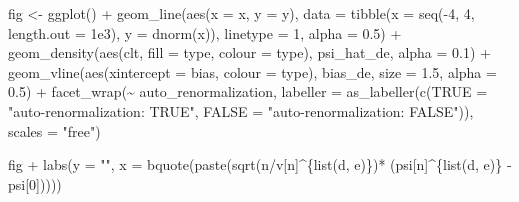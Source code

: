 \documentclass[
  11pt,
  openright,twoside]{book}
\newenvironment{Shaded}{\begin{snugshade}}{\end{snugshade}}
\newcommand{\AttributeTok}[1]{\textcolor[rgb]{0.77,0.63,0.00}{#1}}
\newcommand{\DecValTok}[1]{\textcolor[rgb]{0.00,0.00,0.81}{#1}}
\newcommand{\FloatTok}[1]{\textcolor[rgb]{0.00,0.00,0.81}{#1}}
\newcommand{\FunctionTok}[1]{\textcolor[rgb]{0.00,0.00,0.00}{#1}}
\newcommand{\NormalTok}[1]{#1}
\newcommand{\OtherTok}[1]{\textcolor[rgb]{0.56,0.35,0.01}{#1}}
\newcommand{\SpecialCharTok}[1]{\textcolor[rgb]{0.00,0.00,0.00}{#1}}
\newcommand{\StringTok}[1]{\textcolor[rgb]{0.31,0.60,0.02}{#1}}
\theoremstyle{definition}
\theoremstyle{definition}
\theoremstyle{definition}
\theoremstyle{definition}
\theoremstyle{remark}
\begin{document}
\begin{Shaded}
\begin{Highlighting}[]
\NormalTok{fig }\OtherTok{\textless{}{-}} \FunctionTok{ggplot}\NormalTok{() }\SpecialCharTok{+}
  \FunctionTok{geom\_line}\NormalTok{(}\FunctionTok{aes}\NormalTok{(}\AttributeTok{x =}\NormalTok{ x, }\AttributeTok{y =}\NormalTok{ y), }
            \AttributeTok{data =} \FunctionTok{tibble}\NormalTok{(}\AttributeTok{x =} \FunctionTok{seq}\NormalTok{(}\SpecialCharTok{{-}}\DecValTok{4}\NormalTok{, }\DecValTok{4}\NormalTok{, }\AttributeTok{length.out =} \FloatTok{1e3}\NormalTok{),}
                          \AttributeTok{y =} \FunctionTok{dnorm}\NormalTok{(x)),}
            \AttributeTok{linetype =} \DecValTok{1}\NormalTok{, }\AttributeTok{alpha =} \FloatTok{0.5}\NormalTok{) }\SpecialCharTok{+}
  \FunctionTok{geom\_density}\NormalTok{(}\FunctionTok{aes}\NormalTok{(clt, }\AttributeTok{fill =}\NormalTok{ type, }\AttributeTok{colour =}\NormalTok{ type),}
\NormalTok{               psi\_hat\_de, }\AttributeTok{alpha =} \FloatTok{0.1}\NormalTok{) }\SpecialCharTok{+}
  \FunctionTok{geom\_vline}\NormalTok{(}\FunctionTok{aes}\NormalTok{(}\AttributeTok{xintercept =}\NormalTok{ bias, }\AttributeTok{colour =}\NormalTok{ type),}
\NormalTok{             bias\_de, }\AttributeTok{size =} \FloatTok{1.5}\NormalTok{, }\AttributeTok{alpha =} \FloatTok{0.5}\NormalTok{) }\SpecialCharTok{+}
  \FunctionTok{facet\_wrap}\NormalTok{(}\SpecialCharTok{\textasciitilde{}}\NormalTok{ auto\_renormalization,}
             \AttributeTok{labeller =}
               \FunctionTok{as\_labeller}\NormalTok{(}\FunctionTok{c}\NormalTok{(}\StringTok{\textasciigrave{}}\AttributeTok{TRUE}\StringTok{\textasciigrave{}} \OtherTok{=} \StringTok{"auto{-}renormalization: TRUE"}\NormalTok{,}
                             \StringTok{\textasciigrave{}}\AttributeTok{FALSE}\StringTok{\textasciigrave{}} \OtherTok{=} \StringTok{"auto{-}renormalization: FALSE"}\NormalTok{)),}
             \AttributeTok{scales =} \StringTok{"free"}\NormalTok{)}
  
\NormalTok{fig }\SpecialCharTok{+}
  \FunctionTok{labs}\NormalTok{(}\AttributeTok{y =} \StringTok{""}\NormalTok{,}
       \AttributeTok{x =} \FunctionTok{bquote}\NormalTok{(}\FunctionTok{paste}\NormalTok{(}\FunctionTok{sqrt}\NormalTok{(n}\SpecialCharTok{/}\NormalTok{v[n]}\SpecialCharTok{\^{}}\NormalTok{\{}\FunctionTok{list}\NormalTok{(d, e)\})}\SpecialCharTok{*}
\NormalTok{                        (psi[n]}\SpecialCharTok{\^{}}\NormalTok{\{}\FunctionTok{list}\NormalTok{(d, e)\} }\SpecialCharTok{{-}}\NormalTok{ psi[}\DecValTok{0}\NormalTok{]))))}
\end{Highlighting}
\end{Shaded}
\end{document}
